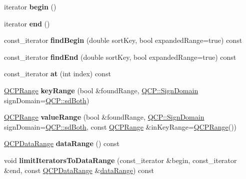 \begin{DoxyCompactItemize}
\item 
\mbox{\label{class_q_c_p_data_container_a58c6f18e40003df1759ef571b485d720}} 
iterator {\bfseries begin} ()
\item 
\mbox{\label{class_q_c_p_data_container_a3c7d450cdad10302e6102f7fe064223c}} 
iterator {\bfseries end} ()
\item 
\mbox{\label{class_q_c_p_data_container_ad64a50ca51bfc70c9c0029d312504642}} 
const\+\_\+iterator {\bfseries find\+Begin} (double sort\+Key, bool expanded\+Range=true) const
\item 
\mbox{\label{class_q_c_p_data_container_a8b9f9f356c54eecde7957d21135bd0d0}} 
const\+\_\+iterator {\bfseries find\+End} (double sort\+Key, bool expanded\+Range=true) const
\item 
\mbox{\label{class_q_c_p_data_container_ac0d5f1babb70699e4732026af1ae12db}} 
const\+\_\+iterator {\bfseries at} (int index) const
\item 
\mbox{\label{class_q_c_p_data_container_aba6e1a93c21ccc56a432b4a02c9d0ed2}} 
\hyperlink{class_q_c_p_range}{Q\+C\+P\+Range} {\bfseries key\+Range} (bool \&found\+Range, \hyperlink{namespace_q_c_p_afd50e7cf431af385614987d8553ff8a9}{Q\+C\+P\+::\+Sign\+Domain} sign\+Domain=\hyperlink{namespace_q_c_p_afd50e7cf431af385614987d8553ff8a9a3dee7e9cd2fedce9253b83e172626a6c}{Q\+C\+P\+::sd\+Both})
\item 
\mbox{\label{class_q_c_p_data_container_a35a102dc2424d1228fc374d9313efbe9}} 
\hyperlink{class_q_c_p_range}{Q\+C\+P\+Range} {\bfseries value\+Range} (bool \&found\+Range, \hyperlink{namespace_q_c_p_afd50e7cf431af385614987d8553ff8a9}{Q\+C\+P\+::\+Sign\+Domain} sign\+Domain=\hyperlink{namespace_q_c_p_afd50e7cf431af385614987d8553ff8a9a3dee7e9cd2fedce9253b83e172626a6c}{Q\+C\+P\+::sd\+Both}, const \hyperlink{class_q_c_p_range}{Q\+C\+P\+Range} \&in\+Key\+Range=\hyperlink{class_q_c_p_range}{Q\+C\+P\+Range}())
\item 
\mbox{\label{class_q_c_p_data_container_aece90eeb2ba8d3c46d3d94023630fbc7}} 
\hyperlink{class_q_c_p_data_range}{Q\+C\+P\+Data\+Range} {\bfseries data\+Range} () const
\item 
\mbox{\label{class_q_c_p_data_container_aa1b36f5ae86a5a5a0b92141d3a0945c4}} 
void {\bfseries limit\+Iterators\+To\+Data\+Range} (const\+\_\+iterator \&begin, const\+\_\+iterator \&end, const \hyperlink{class_q_c_p_data_range}{Q\+C\+P\+Data\+Range} \&\hyperlink{class_q_c_p_data_container_aece90eeb2ba8d3c46d3d94023630fbc7}{data\+Range}) const
\end{DoxyCompactItemize}
